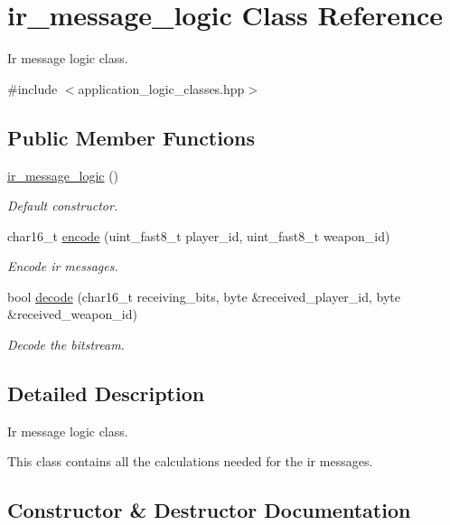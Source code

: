 \hypertarget{classir__message__logic}{}\section{ir\+\_\+message\+\_\+logic Class Reference}
\label{classir__message__logic}


Ir message logic class.  




{\ttfamily \#include $<$application\+\_\+logic\+\_\+classes.\+hpp$>$}

\subsection*{Public Member Functions}
\begin{DoxyCompactItemize}
\item 
\hyperlink{classir__message__logic_af65240d9b8999fd1b956fc2da17a6d3e}{ir\+\_\+message\+\_\+logic} ()
\begin{DoxyCompactList}\small\item\em Default constructor. \end{DoxyCompactList}\item 
char16\+\_\+t \hyperlink{classir__message__logic_a60cf2eae7b2ff8285440068b6419863c}{encode} (uint\+\_\+fast8\+\_\+t player\+\_\+id, uint\+\_\+fast8\+\_\+t weapon\+\_\+id)
\begin{DoxyCompactList}\small\item\em Encode ir messages. \end{DoxyCompactList}\item 
bool \hyperlink{classir__message__logic_aab003c06594ef0dd7caf33d0c928b11b}{decode} (char16\+\_\+t receiving\+\_\+bits, byte \&received\+\_\+player\+\_\+id, byte \&received\+\_\+weapon\+\_\+id)
\begin{DoxyCompactList}\small\item\em Decode the bitstream. \end{DoxyCompactList}\end{DoxyCompactItemize}


\subsection{Detailed Description}
Ir message logic class. 

This class contains all the calculations needed for the ir messages. 

\subsection{Constructor \& Destructor Documentation}
\hypertarget{classir__message__logic_af65240d9b8999fd1b956fc2da17a6d3e}{}\label{classir__message__logic_af65240d9b8999fd1b956fc2da17a6d3e} 
